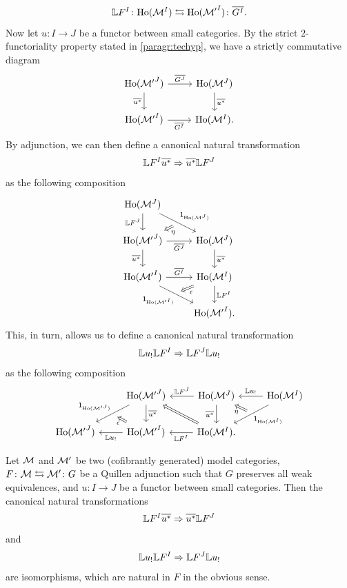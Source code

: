 \begin{paragr}
  \[ \LL \fun{I}{F} \colon \Loc{\fun{I}{\M}}\leftrightarrows
    \Loc{\fun{I}{\M'}} \colon \GZ{\fun{I}{G}}.
  \]
Now let $u \colon I \to J$ be a functor between small
categories. By the strict $2$\nbd-functoriality property stated in
\ref{paragr:techyp}, we have a strictly commutative diagram
  \[
    \begin{tikzcd} \Loc{\fun{J}{\M'}} \ar[r,"\GZ{\fun{J}{G}}"] \ar[d,"\GZ{u^*}"']&
\Loc{\fun{J}{\M}} \ar[d,"\GZ{u^*}"]\\ \Loc{\fun{I}{\M'}} \ar[r,"\GZ{\fun{I}{G}}"'] & \Loc{\fun{I}{\M}}.
    \end{tikzcd}
  \]
  By adjunction, we can then define a canonical natural transformation
  \[
     \LL \fun{I}{F}  \GZ{u^*} \Rightarrow \GZ{u^*}  \LL \fun{J}{F}
   \]
   as the following composition
     \[
       \begin{tikzcd}
         \Loc{\fun{J}{\M}}\ar[d,"\LL \fun{J}{F}"']
         \ar[rd,"\Unit{\Loc{\fun{J}{\M}}}",""{name=A,below left}] & \\
         \Loc{\fun{J}{\M'}} \ar[r,"\GZ{\fun{J}{G}}"'] \ar[d,"\GZ{u^*}"']&
\Loc{\fun{J}{\M}} \ar[d,"\GZ{u^*}"]\\ \Loc{\fun{I}{\M'}}
\ar[r,"\GZ{\fun{I}{G}}"]\ar[rd,"\Unit{\Loc{\fun{I}{\M'}}}"',""{name=B,above
right}] & \Loc{\fun{I}{\M}}\ar[d,"\LL \fun{I}{F}"]\\
&\Loc{\fun{I}{\M'}}.
\ar[from=A,to=2-1,Rightarrow,"\eta"]
\ar[from=3-2,to=B,Rightarrow,"\epsilon"]
    \end{tikzcd}
  \]
  This, in turn, allows us to define a canonical natural transformation
  \[
    \LL u_!\LL \fun{I}{F} \Rightarrow \LL \fun{J}{F} \LL u_! 
  \]
  as the following composition
  \[
    \begin{tikzcd}
    &  \Loc{\fun{J}{\M'}}\ar[d,"\GZ{u^*}"]
    \ar[dl,"\Unit{\Loc{\fun{J}{\M'}}}"',""{name=A,below right}]& \Loc{\fun{J}{\M}} \ar[l,"\LL
    \fun{J}{F}"'] \ar[d,"\GZ{u^*}"'] & \Loc{\fun{I}{\M}} \ar[l,"\LL u_!"']
    \ar[dl,"\Unit{\Loc{\fun{I}{\M}}}",""{name=B,above left}]
      \\
    \Loc{\fun{J}{\M'}} & \ar[l,"\LL u_!"]
    \Loc{\fun{I}{\M'}}&\Loc{\fun{I}{\M}}. \ar[l,"\LL \fun{I}{F}"]
    \ar[from=2-2,to=A,Rightarrow,"\epsilon"]
    \ar[from=B,to=1-3,Rightarrow,"\eta"]
    \ar[from=2-3,to=1-2,Rightarrow]
    \end{tikzcd}
  \]  
\end{paragr}
\begin{proposition}\label{prop:htpycocts} Let $\M$ and $\M'$ be two (cofibrantly generated)
  model categories, $F \colon \M \leftrightarrows \M' \colon G$ be a Quillen adjunction such
  that $G$ preserves all weak equivalences, and
  $u \colon I \to J$ be a functor between small categories. Then the
  canonical natural transformations
  \begin{equation}\label{eq:morphder}
     \LL \fun{I}{F}  \GZ{u^*} \Rightarrow \GZ{u^*}  \LL \fun{J}{F}
   \end{equation}
   and
   \begin{equation}\label{eq:cocontinuous}
     \LL u_!\LL \fun{I}{F} \Rightarrow \LL \fun{J}{F} \LL u_! 
   \end{equation}
   are isomorphisms, which are natural in $F$ in the obvious sense.
\end{proposition}
